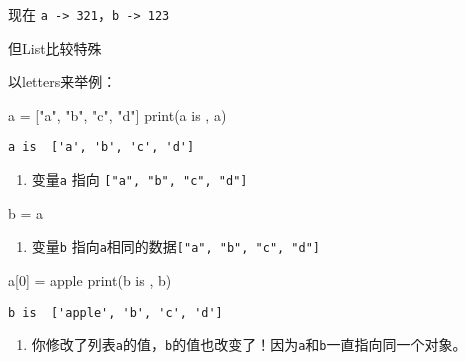 \documentclass[
  letterpaper,
  DIV=11,
  numbers=noendperiod]{scrreprt}
\newenvironment{Shaded}{\begin{snugshade}}{\end{snugshade}}
\newcommand{\BuiltInTok}[1]{\textcolor[rgb]{0.00,0.23,0.31}{#1}}
\newcommand{\DecValTok}[1]{\textcolor[rgb]{0.68,0.00,0.00}{#1}}
\newcommand{\NormalTok}[1]{\textcolor[rgb]{0.00,0.23,0.31}{#1}}
\newcommand{\OperatorTok}[1]{\textcolor[rgb]{0.37,0.37,0.37}{#1}}
\newcommand{\StringTok}[1]{\textcolor[rgb]{0.13,0.47,0.30}{#1}}
\providecommand{\tightlist}{%
  \setlength{\itemsep}{0pt}\setlength{\parskip}{0pt}}\usepackage{longtable,booktabs,array}
\begin{document}
现在 \texttt{a\ -\textgreater{}\ 321}，\texttt{b\ -\textgreater{}\ 123}

但List比较特殊

以letters来举例：

\begin{Shaded}
\begin{Highlighting}[]
\NormalTok{a }\OperatorTok{=}\NormalTok{ [}\StringTok{"a"}\NormalTok{, }\StringTok{"b"}\NormalTok{, }\StringTok{"c"}\NormalTok{, }\StringTok{"d"}\NormalTok{]}
\BuiltInTok{print}\NormalTok{(}\StringTok{\textquotesingle{}a is \textquotesingle{}}\NormalTok{, a)}
\end{Highlighting}
\end{Shaded}

\begin{verbatim}
a is  ['a', 'b', 'c', 'd']
\end{verbatim}

\begin{enumerate}
\def\labelenumi{\arabic{enumi}.}
\tightlist
\item
  变量\texttt{a} 指向 \texttt{{[}"a",\ "b",\ "c",\ "d"{]}}
\end{enumerate}

\begin{Shaded}
\begin{Highlighting}[]
\NormalTok{b }\OperatorTok{=}\NormalTok{ a }
\end{Highlighting}
\end{Shaded}

\begin{enumerate}
\def\labelenumi{\arabic{enumi}.}
\setcounter{enumi}{1}
\tightlist
\item
  变量\texttt{b}
  指向\texttt{a}相同的数据\texttt{{[}"a",\ "b",\ "c",\ "d"{]}}
\end{enumerate}

\begin{Shaded}
\begin{Highlighting}[]
\NormalTok{a[}\DecValTok{0}\NormalTok{] }\OperatorTok{=} \StringTok{\textquotesingle{}apple\textquotesingle{}}
\BuiltInTok{print}\NormalTok{(}\StringTok{\textquotesingle{}b is \textquotesingle{}}\NormalTok{, b)}
\end{Highlighting}
\end{Shaded}

\begin{verbatim}
b is  ['apple', 'b', 'c', 'd']
\end{verbatim}

\begin{enumerate}
\def\labelenumi{\arabic{enumi}.}
\setcounter{enumi}{2}
\tightlist
\item
  你修改了列表\texttt{a}的值，\texttt{b}的值也改变了！因为\texttt{a}和\texttt{b}一直指向同一个对象。
\end{enumerate}
\end{document}

